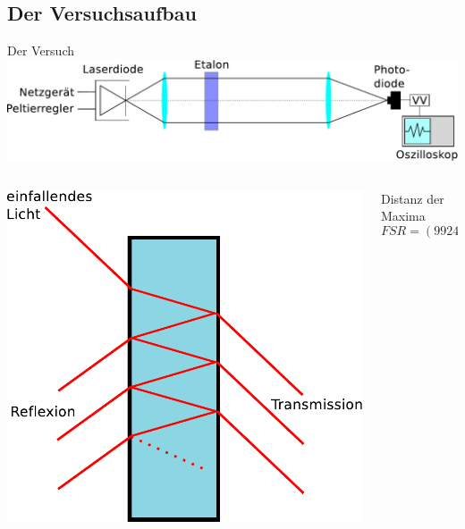 \documentclass{beamer}
\begin{document}
\subsection{Der Versuchsaufbau}
\begin{frame}{Der Versuch}
\centering \includegraphics[width=\textwidth]{Bilder/ABLaser.pdf}
\begin{columns}
\begin{column}{4cm}
\pause \centering \includegraphics[width=\textwidth]{Bilder/etalon.pdf}
\end{column}
\begin{column}{5cm}
Distanz der Maxima
$$ FSR = (9924 \pm 30) MHz $$
\end{column}
\end{columns}
\end{frame}
\end{document}
